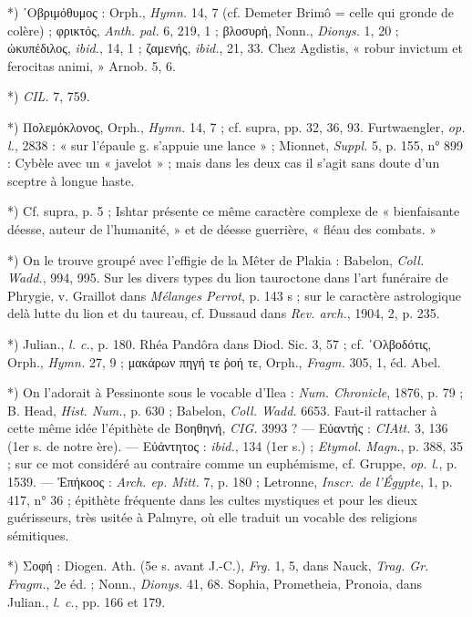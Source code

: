 \documentclass[a4paper, 11pt, oneside, polutonikogreek, french]{article}
\begin{document}
*) ᾽Οβριμόθυμος : Orph., \emph{Hymn.} 14, 7 (cf. Demeter Brimô = celle qui gronde de colère) ; φρικτός, \emph{Anth. pal.} 6, 219, 1 ; βλοσυρή, Nonn., \emph{Dionys.} 1, 20 ; ὠκυπέδιλος, \emph{ibid.}, 14, 1 ; ζαμενής, \emph{ibid.}, 21, 33. Chez Agdistis, « robur invictum et ferocitas animi, » Arnob. 5, 6.

*) \emph{CIL.} 7, 759.

*) Πολεμόκλονος, Orph., \emph{Hymn.} 14, 7 ; cf. supra, pp. 32, 36, 93. Furtwaengler, \emph{op. l.}, 2838 : « sur l'épaule g. s'appuie une lance » ; Mionnet, \emph{Suppl.} 5, p. 155, n° 899 : Cybèle avec un « javelot » ; mais dans les deux cas il s'agit sans doute d'un sceptre à longue haste.

*) Cf. supra, p. 5 ; Ishtar présente ce même caractère complexe de « bienfaisante déesse, auteur de l'humanité, » et de déesse guerrière, « fléau des combats. »

*) On le trouve groupé avec l'effigie de la Mêter de Plakia : Babelon, \emph{Coll. Wadd.}, 994, 995. Sur les divers types du lion tauroctone dans l'art funéraire de Phrygie, v. Graillot dans \emph{Mélanges Perrot}, p. 143 s ; sur le caractère astrologique delà lutte du lion et du taureau, cf. Dussaud dans \emph{Rev. arch.}, 1904, 2, p. 235.

*) Julian., \emph{l. c.}, p. 180. Rhéa Pandôra dans Diod. Sic. 3, 57 ; cf. ᾽Ολβοδότις, Orph., \emph{Hymn.} 27, 9 ; μακάρων πηγή τε ῥοή τε, Orph., \emph{Fragm.} 305, 1, éd. Abel.

*) On l'adorait à Pessinonte sous le vocable d'Ilea : \emph{Num. Chronicle}, 1876, p. 79 ; B. Head, \emph{Hist. Num.}, p. 630 ; Babelon, \emph{Coll. Wadd.} 6653. Faut-il rattacher à cette même idée l'épithète de Βοηθηνή, \emph{CIG.} 3993 ? --- Εὐαντής : \emph{CIAtt.} 3, 136 (1er s. de notre ère). --- Eὐάντητος : \emph{ibid.}, 134 (1er s.) ; \emph{Etymol. Magn.}, p. 388, 35 ; sur ce mot considéré au contraire comme un euphémisme, cf. Gruppe, \emph{op. l.}, p. 1539. --- Ἐπήκοος : \emph{Arch. ep. Mitt.} 7, p. 180 ; Letronne, \emph{Inscr. de l'Égypte}, 1, p. 417, n° 36 ; épithète fréquente dans les cultes mystiques et pour les dieux guérisseurs, très usitée à Palmyre, où elle traduit un vocable des religions sémitiques.

*) Σοφή : Diogen. Ath. (5e s. avant J.-C.), \emph{Frg.} 1, 5, dans Nauck, \emph{Trag. Gr. Fragm.}, 2e éd. ; Nonn., \emph{Dionys.} 41, 68. Sophia, Prometheia, Pronoia, dans Julian., \emph{l. c.}, pp. 166 et 179.
\end{document}
